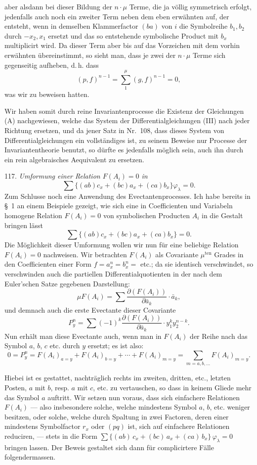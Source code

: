 aber alsdann bei dieser Bildung der $n \cdot \mu$ Terme, die ja völlig symmetrisch erfolgt, jedenfalls auch noch ein zweiter Term neben dem eben erwähnten auf, der entsteht, wenn in demselben Klammerfactor $(ba)$ von $i$ die Symbolreihe $b_1, b_2$ durch $-x_2, x_1$ ersetzt und das so entstehende symbolische Product mit $b_x$ multiplicirt wird. Da dieser Term aber bis auf das Vorzeichen mit dem vorhin erwähnten übereinstimmt, so sieht man, dass je zwei der $n \cdot \mu$ Terme sich gegenseitig aufheben, d.\,h. dass
\[
(p,f)^{n-1} = \sum_1^\mu (g,f)^{n-1} = 0,
\]
was wir zu beweisen hatten.

Wir haben somit durch reine Invariantenprocesse die Existenz der Gleichungen (A) nachgewiesen, welche das System der Differentialgleichungen (III) nach jeder Richtung ersetzen, und da jener Satz in Nr.~108, dass dieses System von Differentialgleichungen ein vollständiges ist, zu seinem Beweise nur Processe der Invariantentheorie benutzt, so dürfte es jedenfalls möglich sein, auch ihn durch ein rein algebraisches Aequivalent zu ersetzen.

117. \textit{Umformung einer Relation $F(A_i)=0$ in}
\[
\sum \{(ab)c_x + (bc)a_x + (ca)b_x\} \varphi_\lambda = 0.
\]
Zum Schlusse noch eine Anwendung des Evectantenprocesses. Ich habe bereits in \S~1 an einem Beispiele gezeigt, wie sich eine in Coefficienten und Variabeln homogene Relation $F(A_i)=0$ von symbolischen Producten $A_i$ in die Gestalt bringen lässt
\[
\sum \{(ab)c_x + (bc)a_x + (ca)b_x\} = 0.
\]
Die Möglichkeit dieser Umformung wollen wir nun für eine beliebige Relation $F(A_i)=0$ nachweisen. Wir betrachten $F(A_i)$ als Covariante $\mu^{\text{ten}}$ Grades in den Coefficienten einer Form $f=a_x^n=b_x^n=$ etc.; da sie identisch verschwindet, so verschwinden auch die partiellen Differentialquotienten in der nach dem Euler'schen Satze gegebenen Darstellung:
\[
\mu F(A_i) = \sum \frac{\partial (F(A_i))}{\partial \bar a_k} \cdot \bar a_k,
\]
und demnach auch die erste Evectante dieser Covariante
\[
P_y^n = \sum (-1)^k \frac{\partial (F(A_i))}{\partial \bar a_k} \cdot y_1^k y_2^{n-k}.
\]
Nun erhält man diese Evectante auch, wenn man in $F(A_i)$ der Reihe nach das Symbol $a$, $b$, $c$ etc. durch $y$ ersetzt; es ist also:
\[
0 = P_y^n = F(A_i)_{a=y} + F(A_i)_{b=y} + \cdots + F(A_i)_{m=y} = \sum_{m=a,b,\ldots} F(A_i)_{m=y}.
\]


Hiebei ist es gestattet, nachträglich rechts im zweiten, dritten, etc.,
letzten Posten, $a$ mit $b$, resp. $a$ mit $c$, etc. zu vertauschen, so dass
in keinem Gliede mehr das Symbol $a$ auftritt. Wir setzen nun voraus,
dass sich einfachere Relationen $F(A_i)$ — also insbesondere solche,
welche mindestens  Symbol $a$, $b$, etc. weniger besitzen, oder
solche, welche durch Spaltung in zwei Factoren, deren einer mindestens
 Symbolfactor $r_x$ oder $(pq)$ ist, sich auf einfachere Relationen
reduciren, — stets in die Form $\sum \{(ab)\,c_x + (bc)\,a_x + (ca)\,b_x\}\,\varphi_\lambda = 0$
bringen lassen. Der Beweis gestaltet sich dann für complicirtere Fälle
folgendermassen.

